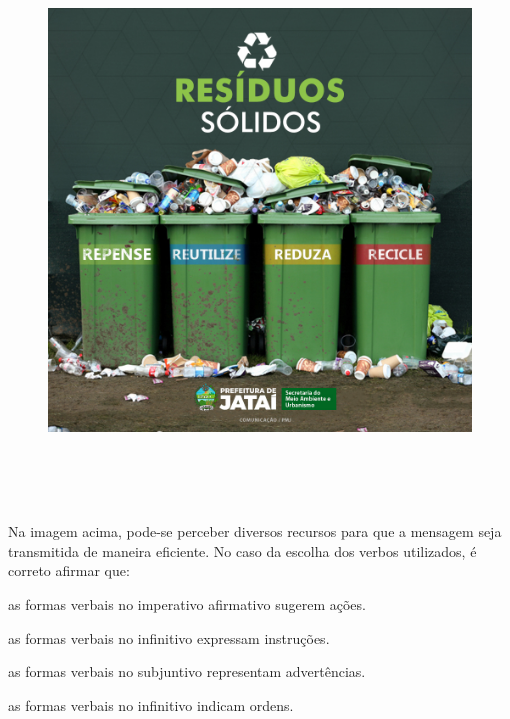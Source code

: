 \begin{figure}[H]
\includegraphics[width=5.90551in,height=5.90278in]{./imgSAEB_7_POR/media/image19.png}
\end{figure}


Na imagem acima, pode-se perceber diversos recursos para que a mensagem
seja transmitida de maneira eficiente. No caso da escolha dos
verbos utilizados, é correto afirmar que:

\begin{escolha}

    \item as formas verbais no imperativo afirmativo sugerem ações.

    \item as formas verbais no infinitivo expressam instruções.

    \item as formas verbais no subjuntivo representam advertências.

    \item as formas verbais no infinitivo indicam ordens.

\end{escolha}

